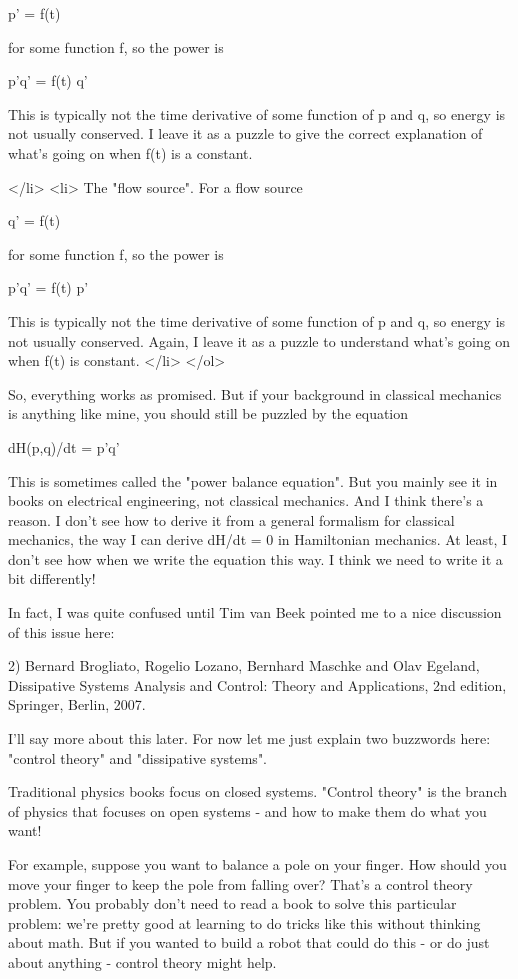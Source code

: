  p' = f(t)

  for some function f, so the power is

  p'q' = f(t) q'

  This is typically not the time derivative of some function of
  p and q, so energy is not usually conserved.  I leave it
  as a puzzle to give the correct explanation of what's going on
  when f(t) is a constant.  

</li>
<li>
  The "flow source".  For a flow source

  q' = f(t)

  for some function f, so the power is

  p'q' = f(t) p'

  This is typically not the time derivative of some function of
  p and q, so energy is not usually conserved.  Again, I
  leave it as a puzzle to understand what's going on when f(t)
  is constant.
</li>
</ol>

So, everything works as promised.  But if your background in classical
mechanics is anything like mine, you should still be puzzled by the
equation

dH(p,q)/dt = p'q'

This is sometimes called the "power balance equation".  But you mainly
see it in books on electrical engineering, not classical mechanics.
And I think there's a reason.  I don't see how to derive it from a
general formalism for classical mechanics, the way I can derive dH/dt
= 0 in Hamiltonian mechanics.  At least, I don't see how when we write
the equation this way.  I think we need to write it a bit differently!

In fact, I was quite confused until Tim van Beek pointed me to a 
nice discussion of this issue here:

2) Bernard Brogliato, Rogelio Lozano, Bernhard Maschke and Olav
Egeland, Dissipative Systems Analysis and Control: Theory and
Applications, 2nd edition, Springer, Berlin, 2007.

I'll say more about this later.  For now let me just explain two
buzzwords here: "control theory" and "dissipative systems".

Traditional physics books focus on closed systems.  "Control theory"
is the branch of physics that focuses on open systems - and how to
make them do what you want!  

For example, suppose you want to balance a pole on your finger.  How
should you move your finger to keep the pole from falling over?
That's a control theory problem.  You probably don't need to read a
book to solve this particular problem: we're pretty good at learning
to do tricks like this without thinking about math.  But if you wanted
to build a robot that could do this - or do just about anything -
control theory might help.

